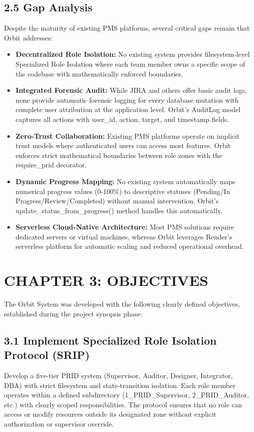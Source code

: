﻿\documentclass[12pt]{article}
\def\normaltext{\fontsize{12pt}{18pt}\color{secondary}}
\begin{document}
\subsection*{2.5 Gap Analysis}
Despite the maturity of existing PMS platforms, several critical gaps remain that Orbit addresses:
\begin{itemize}
\item \textbf{Decentralized Role Isolation:} No existing system provides filesystem-level Specialized Role Isolation where each team member owns a specific scope of the codebase with mathematically enforced boundaries.
\item \textbf{Integrated Forensic Audit:} While JIRA and others offer basic audit logs, none provide automatic forensic logging for every database mutation with complete user attribution at the application level. Orbit's AuditLog model captures all actions with user\_id, action, target, and timestamp fields.
\item \textbf{Zero-Trust Collaboration:} Existing PMS platforms operate on implicit trust models where authenticated users can access most features. Orbit enforces strict mathematical boundaries between role zones with the require\_prid decorator.
\item \textbf{Dynamic Progress Mapping:} No existing system automatically maps numerical progress values (0-100\%) to descriptive statuses (Pending/In Progress/Review/Completed) without manual intervention. Orbit's update\_status\_from\_progress() method handles this automatically.
\item \textbf{Serverless Cloud-Native Architecture:} Most PMS solutions require dedicated servers or virtual machines, whereas Orbit leverages Render's serverless platform for automatic scaling and reduced operational overhead.
\end{itemize}
\newpage

\section*{{\color{primary}CHAPTER 3: OBJECTIVES}}
\normaltext
The Orbit System was developed with the following clearly defined objectives, established during the project synopsis phase:

\subsection*{3.1 Implement Specialized Role Isolation Protocol (SRIP)}
Develop a five-tier PRID system (Supervisor, Auditor, Designer, Integrator, DBA) with strict filesystem and state-transition isolation. Each role member operates within a defined subdirectory (1\_PRID\_Supervisor, 2\_PRID\_Auditor, etc.) with clearly scoped responsibilities. The protocol ensures that no role can access or modify resources outside its designated zone without explicit authorization or supervisor override.
\end{document}
